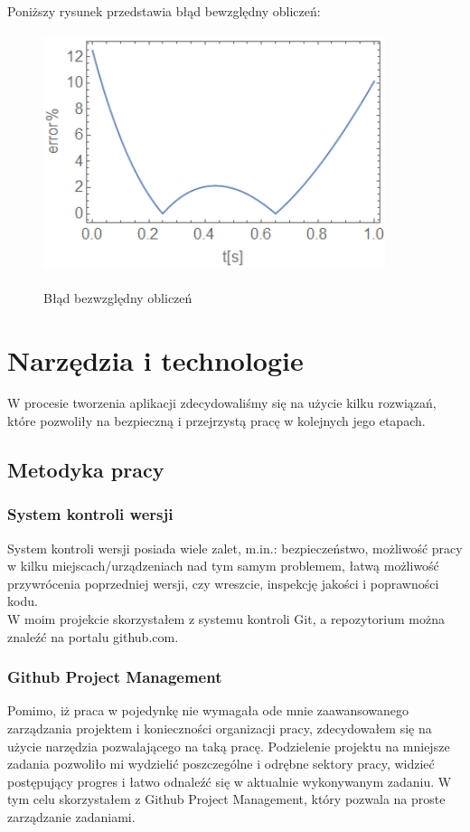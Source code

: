 \documentclass[twoside]{projektInzynierskiMS1}
\newcommand{\si}{ś}
\begin{document}
Poniższy rysunek przedstawia błąd bewzględny obliczeń: \\

\begin{figure}[H]
\begin{center}
		\includegraphics[height=7cm, width=10cm]{pics/5abs.png}\\
	\caption{Błąd bezwzględny obliczeń}
\end{center}
\end{figure}



\section{Narzędzia i technologie}
W procesie tworzenia aplikacji zdecydowali\si my się na użycie kilku rozwiązań, które pozwoliły na bezpieczną i przejrzystą pracę w kolejnych jego etapach. \\
	\subsection{Metodyka pracy}
	\subsubsection{System kontroli wersji}
	System kontroli wersji posiada wiele zalet, m.in.: bezpieczeństwo, możliwo\si ć pracy w kilku miejscach/urządzeniach nad tym samym problemem, łatwą możliwo\si ć przywrócenia poprzedniej wersji, czy wreszcie, inspekcję jako\si ci i poprawno\si ci kodu. \\
W moim projekcie skorzystałem z systemu kontroli Git, a repozytorium można znaleźć na portalu github.com. 
	\subsubsection{Github Project Management}
Pomimo, iż praca w pojedynkę nie wymagała ode mnie zaawansowanego zarządzania projektem i konieczno\si ci organizacji pracy, zdecydowałem się na użycie narzędzia pozwalającego na taką pracę. Podzielenie projektu na mniejsze zadania pozwoliło mi wydzielić poszczególne i odrębne sektory pracy, widzieć postępujący progres i łatwo odnaleźć się w aktualnie wykonywanym zadaniu. W tym celu skorzystałem z Github Project Management, który pozwala na proste zarządzanie zadaniami.
\end{document}
